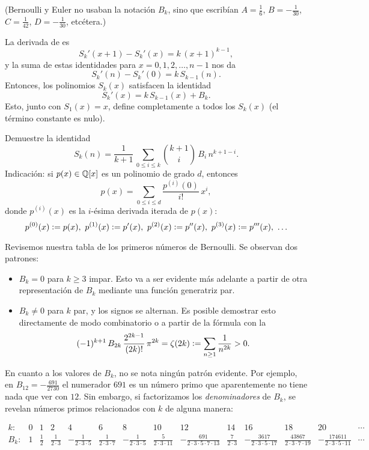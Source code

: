 \documentclass{article}
\begin{document}
\noindent (Bernoulli y Euler no usaban la notación $B_k$, sino que escribían $A = \frac{1}{6}$, $B = -\frac{1}{30}$, $C = \frac{1}{42}$, $D = -\frac{1}{30}$, etcétera.)

La derivada de  es
$$S_k' (x+1) - S_k' (x) = k\,(x+1)^{k-1},$$
y la suma de estas identidades para $x = 0,1,2,\ldots,n-1$ nos da
$$S_k' (n) - S_k' (0) = k\,S_{k-1} (n).$$
Entonces, los polinomios $S_k (x)$ satisfacen la identidad
$$S_k' (x) = k\,S_{k-1} (x) + B_k.$$
Esto, junto con $S_1 (x) = x$, define completamente a todos los $S_k (x)$ (el término constante es nulo).

\begin{ejercicio*}
\label{ejercicio:suma-de-potencias-y-Bk}
Demuestre la identidad
$$S_k (n) = \frac{1}{k+1}\,\sum_{0 \le i \le k} {k+1\choose i}\,B_i\,n^{k+1-i}.$$
\noindent Indicación: si $p (x) \in \mathbb{Q} [x]$ es un polinomio de grado $d$, entonces
$$p (x) = \sum_{0 \le i \le d} \frac{p^{(i)} (0)}{i!}\,x^i,$$
donde $p^{(i)} (x)$ es la $i$-ésima derivada iterada de $p (x)$:
$$p^{(0)} (x) \mathrel{\mathop:}= p (x), ~ p^{(1)} (x) \mathrel{\mathop:}= p' (x), ~ p^{(2)} (x) \mathrel{\mathop:}= p'' (x), ~ p^{(3)} (x) \mathrel{\mathop:}= p''' (x), ~ \ldots$$
\end{ejercicio*}

Revisemos nuestra tabla de los primeros números de Bernoulli. Se observan dos patrones:

\begin{itemize}
\item $B_k = 0$ para $k \ge 3$ impar. Esto va a ser evidente más adelante a partir de otra representación de $B_k$ mediante una función generatriz par.

\item $B_k \ne 0$ para $k$ par, y los signos se alternan.
Es posible demostrar esto directamente de modo combinatorio o a partir de la fórmula con la 
$$(-1)^{k+1} \, B_{2k}\,\frac{2^{2k-1}}{(2k)!}\,\pi^{2k} = \zeta (2k) \mathrel{\mathop:}= \sum_{n \ge 1} \frac{1}{n^{2k}} > 0.$$
\end{itemize}

En cuanto a los valores de $B_k$, no se nota ningún patrón evidente. Por ejemplo, en $B_{12} = -\frac{691}{2730}$ el numerador $691$ es un número primo que aparentemente no tiene nada que ver con $12$. Sin embargo, si factorizamos los \emph{denominadores} de $B_k$, se revelan números primos relacionados con $k$ de alguna manera:

{\def\arraystretch{1.25}
\[ \begin{array}{rccccccccccccccc}
k\colon & 0 & 1 & 2 & 4 & 6 & 8 & 10 & 12 & 14 & 16 & 18 & 20 & \cdots \\
\hline
B_k\colon & 1 & \frac{1}{2} & \frac{1}{2\cdot 3} & -\frac{1}{2\cdot 3\cdot 5} & \frac{1}{2\cdot 3\cdot 7} & -\frac{1}{2\cdot 3\cdot 5} & \frac{5}{2\cdot 3\cdot 11} & -\frac{691}{2\cdot 3\cdot 5\cdot 7\cdot 13} & \frac{7}{2\cdot 3} & -\frac{3617}{2\cdot 3\cdot 5\cdot 17} & \frac{43867}{2\cdot 3\cdot 7\cdot 19} & -\frac{174611}{2\cdot 3\cdot 5\cdot 11} & \cdots
\end{array} \]
}
\end{document}
